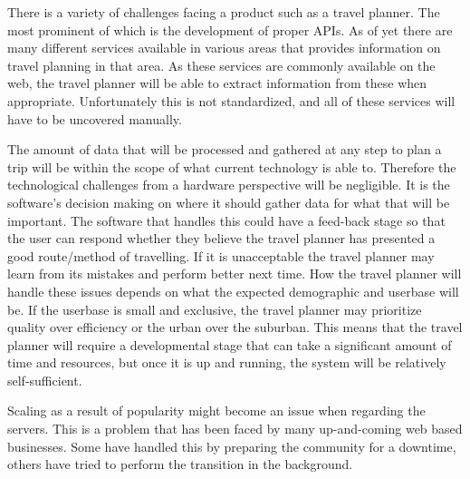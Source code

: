 There is a variety of challenges facing a product such as a travel planner. The
most prominent of which is the development of proper APIs. As of yet there are
many different services available in various areas that provides information on
travel planning in that area. As these services are commonly available on the
web, the travel planner will be able to extract information from these when
appropriate. Unfortunately this is not standardized, and all of these services 
will have to be uncovered manually.

The amount of data that will be processed and gathered at any step to plan a trip will be within the
scope of what current technology is able to. Therefore the technological
challenges from a hardware perspective will be negligible. It is the software's
decision making on where it should gather data for what that will be
important. The software that handles this could have a feed-back stage so that
the user can respond whether they believe the travel planner has presented a
good route/method of travelling. If it is unacceptable the travel planner may learn
from its mistakes and perform better next time. How the travel planner will
handle these issues depends on what the expected demographic and userbase will
be. If the userbase is small and exclusive, the travel planner may prioritize
quality over efficiency or the urban over the suburban. This means that the
travel planner will require a developmental stage that can take a significant
amount of time and resources, but once it is up and running, the system will be
relatively self-sufficient.

Scaling as a result of popularity might become an
issue when regarding the servers. This is a problem that has been faced by many
up-and-coming web based businesses. Some have handled this by preparing the
community for a downtime, others have tried to perform the transition in the
background. 
